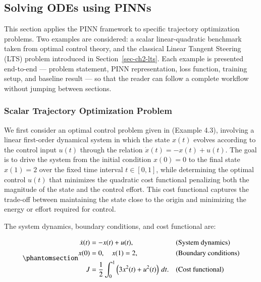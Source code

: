 \documentclass[
  number,
  preprint]{elsarticle}
\begin{document}
\subsection{Solving ODEs using PINNs}\label{solving-odes-using-pinns}

This section applies the PINN framework to specific trajectory
optimization problems. Two examples are considered: a scalar
linear-quadratic benchmark taken from optimal control theory, and the
classical Linear Tangent Steering (LTS) problem introduced in
Section~\ref{sec-ch2-lts}. Each example is presented end-to-end ---
problem statement, PINN representation, loss function, training setup,
and baseline result --- so that the reader can follow a complete
workflow without jumping between sections.

\subsubsection{Scalar Trajectory Optimization
Problem}\label{scalar-trajectory-optimization-problem}

We first consider an optimal control problem given in
\citep{pinch1995optimal} (Example 4.3), involving a linear first-order
dynamical system in which the state \(x(t)\) evolves according to the
control input \(u(t)\) through the relation
\(\dot{x}(t) = -x(t) + u(t)\). The goal is to drive the system from the
initial condition \(x(0) = 0\) to the final state \(x(1) = 2\) over the
fixed time interval \(t \in [0, 1]\), while determining the optimal
control \(u(t)\) that minimizes the quadratic cost functional penalizing
both the magnitude of the state and the control effort. This cost
functional captures the trade-off between maintaining the state close to
the origin and minimizing the energy or effort required for control.

The system dynamics, boundary conditions, and cost functional are:

\begin{equation}\protect\phantomsection\label{eq-ch3-scalar-problem}{
\begin{aligned}
\dot{x}(t) &= -x(t) + u(t), && \text{(System dynamics)} \\
x(0) &= 0, \quad x(1) = 2, && \text{(Boundary conditions)} \\
J &= \frac{1}{2} \int_0^1 \left( 3x^2(t) + u^2(t) \right) \, dt. && \text{(Cost functional)}
\end{aligned}
}\end{equation}
\end{document}
